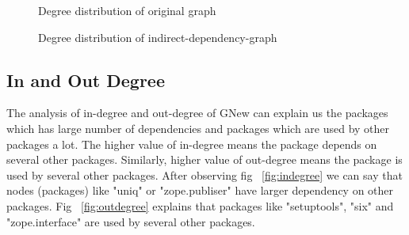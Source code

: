 \begin{figure}[gdegree]
\centering
{}
\caption{Degree distribution of original graph}
\label{fig:gdegree}
\end{figure}

\begin{figure}[gnewdegree]
\centering
{}
\caption{Degree distribution of indirect-dependency-graph}
\label{fig:gnewdegree}
\end{figure}


\subsection{In and Out Degree} \label{inoutdegree}
The analysis of in-degree and out-degree of GNew can explain us the packages
which has large number of dependencies and packages which are used by other
packages a lot.
The higher value of in-degree means the package depends on several other
packages. Similarly, higher value of out-degree means the package is used by
several other packages.
After observing fig ~\ref{fig:indegree} we can say that nodes (packages) like
 "uniq" or "zope.publiser" have larger dependency on other packages.
Fig ~\ref{fig:outdegree} explains that packages like "setuptools", "six" and
 "zope.interface" are used by several other packages.

